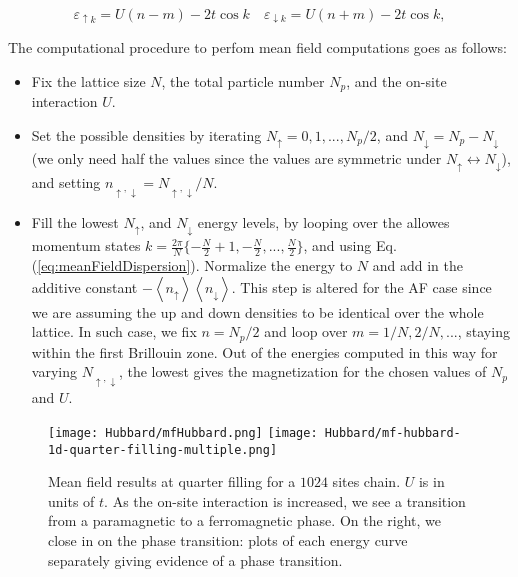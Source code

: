 \begin{equation}\label{eq:meanFieldDispersion}
\varepsilon_{\uparrow k} = U ( n - m ) - 2 t \cos k \quad \varepsilon_{\downarrow k} = U ( n + m ) - 2 t \cos k ,
\end{equation}

The computational procedure to perfom mean field computations goes as follows:
\begin{itemize}
\item Fix the lattice size $N$, the total particle number $N_p$, and the on-site interaction $U$.
\item Set the possible densities by iterating $N_\uparrow = 0, 1, ..., N_p / 2$, and $N_\downarrow = N_p - N_\downarrow$ (we only need half the values since the values are symmetric under $ N_\uparrow \leftrightarrow N_\downarrow$), and setting $n_{\uparrow, \downarrow} = N_{\uparrow, \downarrow} / N$.
\item Fill the lowest $N_\uparrow$, and $N_\downarrow$ energy levels, by looping over the allowes momentum states $k = \frac{2\pi}{N} \{ -\frac{N}{2} + 1, -\frac{N}{2}, ..., \frac{N}{2} \}$, and using Eq.(\ref{eq:meanFieldDispersion}).
Normalize the energy to $N$ and add in the additive constant $- \left\langle n_\uparrow \right\rangle \left\langle n_\downarrow \right\rangle$.
This step is altered for the \acs{AF} case since we are assuming the up and down densities to be identical over the whole lattice.
In such case, we fix $n = N_p / 2$ and loop over $m = 1/ N, 2 / N,...$, staying within the first Brillouin zone.
Out of the energies computed in this way for varying $N_{\uparrow, \downarrow}$, the lowest gives the magnetization for the chosen values of $N_p$ and $U$.
\end{itemize}

\begin{figure}
\hspace{-3mm}
\texttt{[image: Hubbard/mfHubbard.png]}
\hspace{-2.5mm}
\texttt{[image: Hubbard/mf-hubbard-1d-quarter-filling-multiple.png]}
	\caption[Mean field results for the \acs{1D} Hubbard model.]{Mean field results at quarter filling for a $ 1024$ sites chain.
	$U$ is in units of $t$.
	As the on-site interaction is increased, we see a transition from a paramagnetic to a ferromagnetic phase. On the right, we close in on the phase transition: plots of each energy curve separately giving evidence of a phase transition.}
	\label{fig:mft}
\end{figure}


